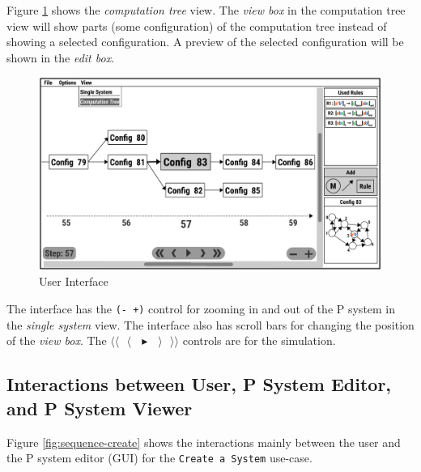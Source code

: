 \documentclass{article}
\begin{document}
Figure \ref{fig:gui-3} shows the \textit{computation tree} view. The \textit{view box} in the
computation tree view will show parts (some configuration) of the computation tree instead of
showing a selected configuration. A preview of the selected configuration will be shown in the
\textit{edit box}.

\begin{figure}[H]
\begin{center}
    \includegraphics[scale=0.5]{figures/zzz-gui-3.pdf}
    \caption{User Interface}
    \label{fig:gui-3}
\end{center}
\end{figure}

The interface has the \texttt{(- +)} control for zooming in and out of the P system in the
\textit{single system} view. The interface also has scroll bars for changing the position of the 
\textit{view box}. The \texttt{$\langle\langle\text{   }\langle\text{  }\blacktriangleright\text{  }
\rangle\text{   }\rangle\rangle$} controls are for the simulation.


\subsection{Interactions between User, P System Editor, and P System Viewer}

Figure \ref{fig:sequence-create} shows the interactions mainly between the user and the P system 
editor (GUI) for the \texttt{Create a System} use-case.
\end{document}
